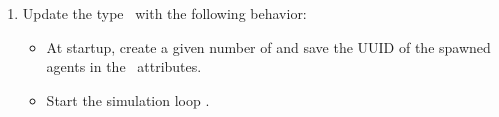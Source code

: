 \documentclass[english,nodocumentinfo,nopubpage]{utbmciadreport}
\begin{document}
\begin{enumerate}
\begin{itemize}
	\end{itemize}
\item Update the type \ with the following behavior:
	\begin{itemize}
	\item At startup, create a given number of  and save the UUID of the spawned agents in the \ attributes.
	\item Start the simulation loop .
	\end{itemize}
\end{enumerate}	
\end{document}
